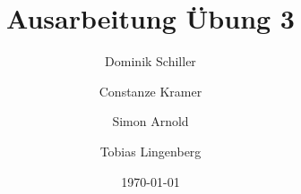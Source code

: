 \documentclass[
ngerman,
twoside,
pdfa=false,
ruledheaders=section,%
class=report,%
thesis={type=sta},%
accentcolor=TUDa-2c,%
custommargins=false,%
marginpar=false,%
parskip=half-,%
fontsize=11pt,%
]{tudapub}
\begin{document}
	\title{Ausarbeitung Übung 3}
	\author[D. Schiller, C. Kramer, S.Arnold, T. Lingenberg]{Dominik Schiller \and Constanze Kramer \and Simon Arnold \and Tobias Lingenberg} %
	
	\department{} %

	
	\date{\today}
	
	
	\maketitle
	
	
	
	
	
	\cleardoublepage
	\tableofcontents %
	
	\setcounter{page}{1} %
	
	
	
	
	
	
	
	
	\listoffigures %
	
	
	
\end{document}
